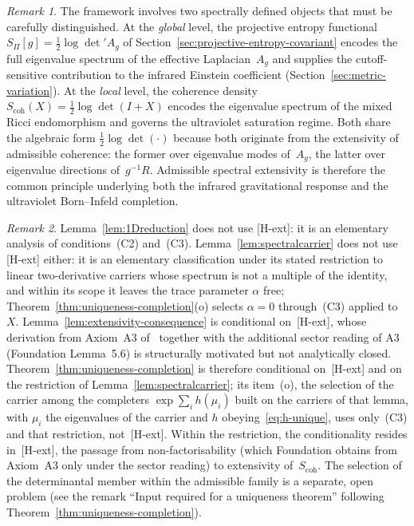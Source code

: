 \documentclass[pdflatex,sn-mathphys-num]{sn-jnl} %
\theoremstyle{remark}
\newtheorem*{remark}{Remark}
\theoremstyle{plain}
\begin{document}
    \begin{remark}
      The framework involves two spectrally defined objects
      that must be carefully distinguished.
      At the \emph{global} level, the projective entropy
      functional
      $S_\Pi[g] = \tfrac{1}{2}\log\det' A_g$
      of Section~\ref{sec:projective-entropy-covariant}
      encodes the full eigenvalue spectrum of the effective
      Laplacian~$A_g$ and supplies the cutoff-sensitive contribution to the infrared Einstein coefficient
      (Section~\ref{sec:metric-variation}).
      At the \emph{local} level, the coherence density
      $S_{\mathrm{coh}}(X)
      = \tfrac{1}{2}\log\det(I + X)$
      encodes the eigenvalue spectrum of the mixed Ricci
      endomorphism and governs the ultraviolet saturation
      regime.
      Both share the algebraic form
      $\tfrac{1}{2}\log\det(\cdot)$ because both originate
      from the extensivity of admissible coherence:
      the former over eigenvalue modes of~$A_g$, the latter
      over eigenvalue directions of~$g^{-1}R$.
      Admissible spectral extensivity is therefore the common
      principle underlying both the infrared gravitational
      response and the ultraviolet Born--Infeld completion.
    \end{remark}

    \begin{remark}
      Lemma~\ref{lem:1Dreduction} does not use [H-ext]:
      it is an elementary analysis of
      conditions~(C2) and~(C3).
      Lemma~\ref{lem:spectralcarrier} does not use [H-ext] either:
      it is an elementary classification under its stated restriction to linear two-derivative carriers whose
      spectrum is not a multiple of the identity, and within its scope it leaves the trace parameter $\alpha$ free;
      Theorem~\ref{thm:uniqueness-completion}(o) selects $\alpha = 0$ through~(C3) applied to $X$.
      Lemma~\ref{lem:extensivity-consequence} is conditional
      on~[H-ext], whose derivation from Axiom~A3
      of~\cite{Beau2026m} together with the additional sector reading of A3 (Foundation Lemma~5.6) is
      structurally motivated but not analytically closed.
      Theorem~\ref{thm:uniqueness-completion} is therefore
      conditional on~[H-ext] and on the restriction of Lemma~\ref{lem:spectralcarrier}; its item~(o), the selection
      of the carrier among the completers $\exp\sum_i h(\mu_i)$ built on the carriers of that lemma, with $\mu_i$
      the eigenvalues of the carrier and $h$ obeying~\eqref{eq:h-unique}, uses only~(C3) and that restriction,
      not~[H-ext].
      Within the restriction, the conditionality resides in~[H-ext], the passage from non-factorisability
      (which Foundation obtains from Axiom~A3 only under the sector reading) to extensivity of~$S_{\mathrm{coh}}$.
      The selection of the determinantal member within the
      admissible family is a separate, open problem
      (see the remark ``Input required for a uniqueness theorem'' following
      Theorem~\ref{thm:uniqueness-completion}).
    \end{remark}
\end{document}
